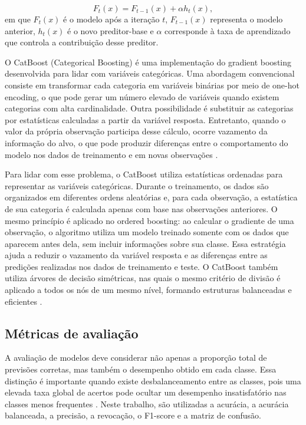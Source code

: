 \documentclass[12pt]{article}
\begin{document}
\begin{equation}
F_t(x) = F_{t-1}(x) + \alpha h_t(x),
\end{equation}
em que $F_t(x)$ é o modelo após a iteração $t$, $F_{t-1}(x)$ representa o modelo anterior, $h_t(x)$ é o novo preditor-base e $\alpha$ corresponde à taxa de aprendizado que controla a contribuição desse preditor.

O CatBoost (Categorical Boosting) é uma implementação do gradient boosting desenvolvida para lidar com variáveis categóricas. Uma abordagem convencional consiste em transformar cada categoria em variáveis binárias por meio de one-hot encoding, o que pode gerar um número elevado de variáveis quando existem categorias com alta cardinalidade. Outra possibilidade é substituir as categorias por estatísticas calculadas a partir da variável resposta. Entretanto, quando o valor da própria observação participa desse cálculo, ocorre vazamento da informação do alvo, o que pode produzir diferenças entre o comportamento do modelo nos dados de treinamento e em novas observações \cite{prokhorenkova2018catboost}.

Para lidar com esse problema, o CatBoost utiliza estatísticas ordenadas para representar as variáveis categóricas. Durante o treinamento, os dados são organizados em diferentes ordens aleatórias e, para cada observação, a estatística de sua categoria é calculada apenas com base nas observações anteriores. O mesmo princípio é aplicado no ordered boosting: ao calcular o gradiente de uma observação, o algoritmo utiliza um modelo treinado somente com os dados que aparecem antes dela, sem incluir informações sobre sua classe. Essa estratégia ajuda a reduzir o vazamento da variável resposta e as diferenças entre as predições realizadas nos dados de treinamento e teste. O CatBoost também utiliza árvores de decisão simétricas, nas quais o mesmo critério de divisão é aplicado a todos os nós de um mesmo nível, formando estruturas balanceadas e eficientes \cite{prokhorenkova2018catboost}.

\subsection{Métricas de avaliação}

A avaliação de modelos deve considerar não apenas a proporção total de previsões corretas, mas também o desempenho obtido em cada classe. Essa distinção é importante quando existe desbalanceamento entre as classes, pois uma elevada taxa global de acertos pode ocultar um desempenho insatisfatório nas classes menos frequentes \cite{james2023islp}. Neste trabalho, são utilizadas a acurácia, a acurácia balanceada, a precisão, a revocação, o F1-score e a matriz de confusão.
\end{document}
